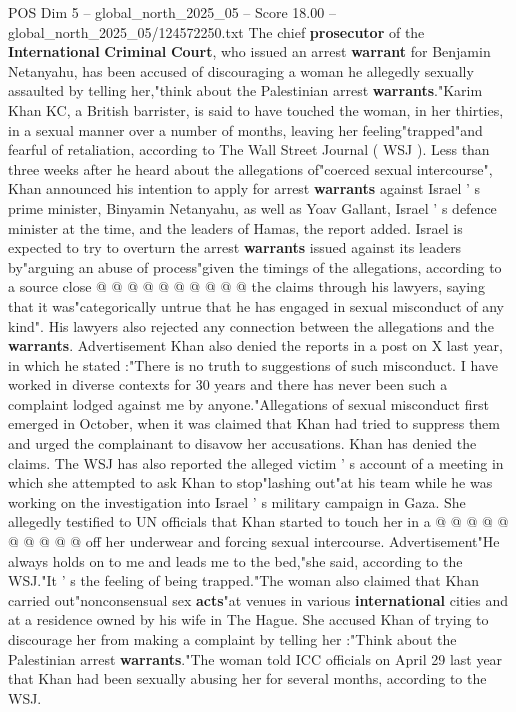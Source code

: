 \begin{textsample}{POS Dim 5 – global\_north\_2025\_05 – Score 18.00 – global\_north\_2025\_05/124572250.txt}  \label{ex:f5_pos_077}
The chief \textbf{prosecutor} of the \textbf{International} \textbf{Criminal} \textbf{Court}, who issued an arrest \textbf{warrant} for Benjamin Netanyahu, has been accused of discouraging a woman he allegedly sexually assaulted by telling her,"think about the Palestinian arrest \textbf{warrants}."Karim Khan KC, a British barrister, is said to have touched the woman, in her thirties, in a sexual manner over a number of months, leaving her feeling"trapped"and fearful of retaliation, according to The Wall Street Journal ( WSJ ).
Less than three weeks after he heard about the allegations of"coerced sexual intercourse", Khan announced his intention to apply for arrest \textbf{warrants} against Israel ' s prime minister, Binyamin Netanyahu, as well as Yoav Gallant, Israel ' s defence minister at the time, and the leaders of Hamas, the report added.
Israel is expected to try to overturn the arrest \textbf{warrants} issued against its leaders by"arguing an abuse of process"given the timings of the allegations, according to a source close @ @ @ @ @ @ @ @ @ @ the claims through his lawyers, saying that it was"categorically untrue that he has engaged in sexual misconduct of any kind".
His lawyers also rejected any connection between the allegations and the \textbf{warrants}.
Advertisement Khan also denied the reports in a post on X last year, in which he stated :"There is no truth to suggestions of such misconduct.
I have worked in diverse contexts for 30 years and there has never been such a complaint lodged against me by anyone."Allegations of sexual misconduct first emerged in October, when it was claimed that Khan had tried to suppress them and urged the complainant to disavow her accusations.
Khan has denied the claims.
The WSJ has also reported the alleged victim ' s account of a meeting in which she attempted to ask Khan to stop"lashing out"at his team while he was working on the investigation into Israel ' s military campaign in Gaza.
She allegedly testified to UN officials that Khan started to touch her in a @ @ @ @ @ @ @ @ @ @ off her underwear and forcing sexual intercourse.
Advertisement"He always holds on to me and leads me to the bed,"she said, according to the WSJ."It ' s the feeling of being trapped."The woman also claimed that Khan carried out"nonconsensual sex \textbf{acts}"at venues in various \textbf{international} cities and at a residence owned by his wife in The Hague.
She accused Khan of trying to discourage her from making a complaint by telling her :"Think about the Palestinian arrest \textbf{warrants}."The woman told ICC officials on April 29 last year that Khan had been sexually abusing her for several months, according to the WSJ.

\end{textsample}
